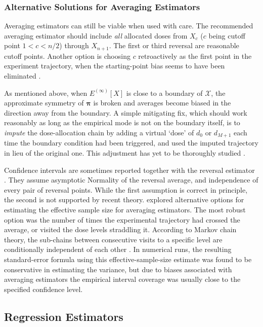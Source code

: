 \subsubsection{Alternative Solutions for Averaging Estimators}

Averaging estimators can still be viable when used with care. The recommended averaging estimator should include \emph{all} allocated doses from $X_c$ ($c$ being cutoff point $1<c<n/2$) through $X_{n+1}$. The first or third reversal are reasonable cutoff points. Another option is choosing $c$ retroactively as the first point in the experiment trajectory, when the starting-point bias seems to have been eliminated \citep[Section~3.3]{Oron07}.

As mentioned above, when $E^{(\infty)}[X]$ is close to a boundary of $\mathcal{X}$, the approximate symmetry of $\boldsymbol{\pi}$ is broken and averages become biased in the direction away from the boundary. A simple mitigating fix, which should work reasonably as long as the empirical mode is not on the boundary itself, is to \emph{impute} the dose-allocation chain by adding a virtual `dose' of $d_0$ or $d_{M+1}$ each time the boundary condition had been triggered, and used the imputed trajectory in lieu of the original one. This adjustment has yet to be thoroughly studied \citep[Section~3.3]{Oron07}.

Confidence intervals are sometimes reported together with the reversal estimator \cite{Capo:Parp:Lyon:Colu:Cell:Mini:2001,Camo:Capo:Lyon:Colu:Epid:2004}. They assume asymptotic Normality of the reversal average, and independence of every pair of reversal points. While the first assumption is correct in principle, the second is not supported by recent theory. \citep[Section~3.3]{Oron07} explored alternative options for estimating the effective sample size for averaging estimators. The most robust option was the number of times the experimental trajectory had crossed the average, or visited the dose levels straddling it. According to Markov chain theory, the sub-chains between consecutive visits to a specific level are conditionally independent of each other \cite{Tsut:rand:1967}. In numerical runs, the resulting standard-error formula using this effective-sample-size estimate was found to be conservative in estimating the variance, but due to biases associated with averaging estimators the empirical interval coverage was usually close to the specified confidence level.

\subsection{Regression Estimators}

